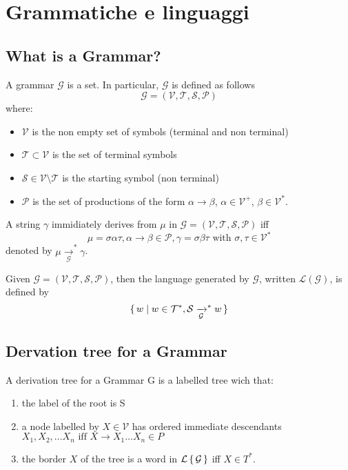 \chapter{Grammatiche e linguaggi}

\section{What is a Grammar?}

A grammar $\mathcal{G}$ is a set. In particular, $\mathcal{G}$ is defined as follows
\begin{equation}
\mathcal{G} = (\mathcal{V}, \mathcal{T}, \mathcal{S}, \mathcal{P})
\end{equation}
where:
\begin{itemize}
\item $\mathcal{V}$ is the non empty set of symbols (terminal and non terminal)
\item $\mathcal{T} \subset \mathcal{V}$ is the set of terminal symbols
\item $\mathcal{S} \in \mathcal{V} \setminus \mathcal{T}$ is the starting symbol (non terminal)
\item $\mathcal{P}$ is the set of productions of the form $\alpha \rightarrow \beta$, $\alpha \in \mathcal{V}^+$, $\beta \in \mathcal{V}^*$.
\end{itemize}

A string $\gamma$ immidiately derives from $\mu$ in $\mathcal{G} = (\mathcal{V}, \mathcal{T}, \mathcal{S}, \mathcal{P})$ iff
\begin{equation}
\mu = \sigma \alpha \tau, \alpha \rightarrow \beta \in \mathcal{P}, \gamma = \sigma \beta \tau \text{ with } \sigma,\tau \in \mathcal{V}^*
\end{equation}
denoted by $\mu \xrightarrow[\mathcal{G}]{}^* \gamma$.

Given $\mathcal{G} = (\mathcal{V}, \mathcal{T}, \mathcal{S}, \mathcal{P})$, then the language generated by $\mathcal{G}$, written $\mathcal{L(G)}$, is defined by
\[
\set{ w | w \in \mathcal{T}^*, \mathcal{S} \xrightarrow[\mathcal{G}]{}^* w }
\]

\section{Dervation tree for a Grammar}
A derivation tree for a Grammar G is a labelled tree wich that:
\begin{enumerate}
\item the label of the root is S
\item a node labelled by $X \in \mathcal{V}$ has ordered immediate descendants \\ $X_1, X_2, \dots X_n \text{ iff } X \rightarrow X_1 \dots X_n \in P$
\item the border $X$ of the tree is a word in $\mathcal{L\set{G}}$ iff $X \in T^*$.
\end{enumerate}


